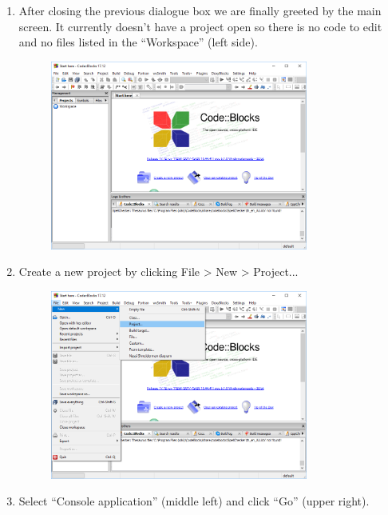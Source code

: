 \documentclass{lab}
\begin{document}
\begin{enumerate}
\item After closing the previous dialogue box we are finally greeted by the main screen. It currently doesn't have a project open so there is no code to edit and no files listed in the ``Workspace'' (left side).

\begin{figure}[H]
\begin{center}
\includegraphics[width=0.8\textwidth]{Wk1Images/cb1}
\end{center}
\end{figure}

\item Create a new project by clicking File > New > Project...

\begin{figure}[H]
\begin{center}
\includegraphics[width=0.8\textwidth]{Wk1Images/cb2}
\end{center}
\end{figure}
\pagebreak

\item Select ``Console application'' (middle left) and click ``Go'' (upper right).


\end{enumerate}
\end{document}
